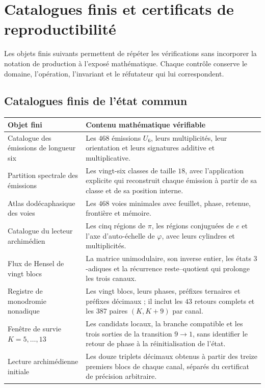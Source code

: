 \chapter{Catalogues finis et certificats de reproductibilité}
\label{app:datos-reproducibles}

Les objets finis suivants permettent de répéter les vérifications sans
incorporer la notation de production à l'exposé mathématique. Chaque contrôle
conserve le domaine, l'opération, l'invariant et le réfutateur qui lui
correspondent.

\section{Catalogues finis de l'état commun}

\begin{longtable}{@{}>{\raggedright\arraybackslash}p{}
  >{\raggedright\arraybackslash}p{}@{}}
\toprule
Objet fini & Contenu mathématique vérifiable\\
\midrule
\endhead
Catalogue des émissions de longueur six
& Les \(468\) émissions \(U_6\), leurs multiplicités, leur orientation et leurs signatures
additive et multiplicative.\\
Partition spectrale des émissions
& Les vingt-six classes de taille \(18\), avec l'application explicite qui
reconstruit chaque émission à partir de sa classe et de sa position interne.\\
Atlas dodécaphasique des voies
& Les \(468\) voies minimales avec feuillet, phase, retenue, frontière et mémoire.\\
Catalogue du lecteur archimédien
& Les cinq régions de \(\pi\), les régions conjuguées de \(e\) et l'axe
d'auto-échelle de \(\varphi\), avec leurs cylindres et multiplicités.\\
Flux de Hensel de vingt blocs
& La matrice unimodulaire, son inverse entier, les états \(3\)-adiques et la
récurrence reste--quotient qui prolonge les trois canaux.\\
Registre de monodromie nonadique
& Les vingt blocs, leurs phases, préfixes ternaires et préfixes décimaux ;
il inclut les \(43\) retours complets et les \(387\) paires \((K,K+9)\) par
canal.\\
Fenêtre de survie \(K=5,\ldots,13\)
& Les candidats locaux, la branche compatible et les trois sorties de la
transition \(9\to1\), sans identifier le retour de phase à la réinitialisation de l'état.\\
Lecture archimédienne initiale
& Les douze triplets décimaux obtenus à partir des treize premiers blocs de chaque
canal, séparés du certificat de précision arbitraire.\\
\bottomrule
\end{longtable}

